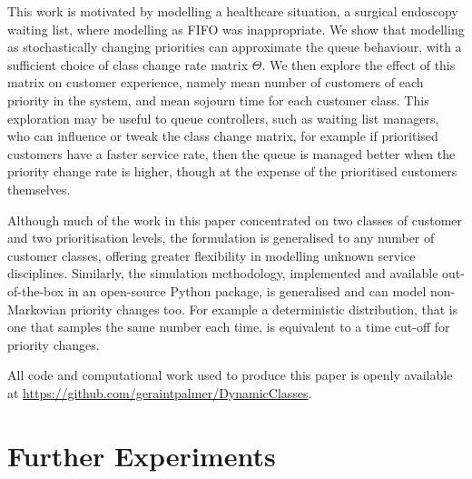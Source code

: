 \documentclass{article}
\begin{document}
This work is motivated by modelling a healthcare situation, a surgical endoscopy
waiting list, where modelling as FIFO was inappropriate. We show that modelling
as stochastically changing priorities can approximate the queue behaviour,
with a sufficient choice of class change rate matrix $\Theta$. We then explore
the effect of this matrix on customer experience, namely mean number of
customers of each priority in the system, and mean sojourn time for each
customer class. This exploration may be useful to queue controllers, such as
waiting list managers, who can influence or tweak the class change matrix, for
example if prioritised customers have a faster service rate, then the queue is
managed better when the priority change rate is higher, though at the expense of
the prioritised customers themselves.

Although much of the work in this paper concentrated on two classes of customer
and two prioritisation levels, the formulation is generalised to any number of
customer classes, offering greater flexibility in modelling unknown service
disciplines. Similarly, the simulation methodology, implemented and available
out-of-the-box in an open-source Python package, is generalised and can model
non-Markovian priority changes too. For example a deterministic distribution,
that is one that samples the same number each time, is equivalent to a time
cut-off for priority changes.

All code and computational work used to produce this paper is openly available
at \url{https://github.com/geraintpalmer/DynamicClasses}.




\newpage
\appendix

\section{Further Experiments}\label{apx:more_priority_classes}
\end{document}
